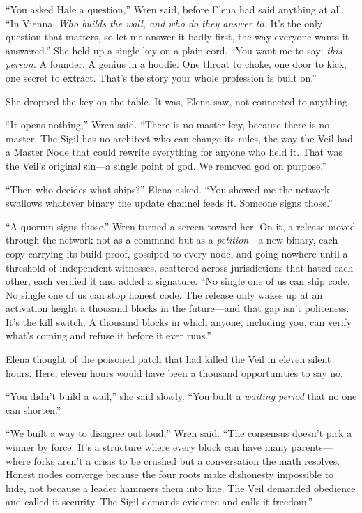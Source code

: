 ``You asked Hale a question,'' Wren said, before Elena had said anything at
all. ``In Vienna. \emph{Who builds the wall, and who do they answer to.} It's
the only question that matters, so let me answer it badly first, the way
everyone wants it answered.'' She held up a single key on a plain cord. ``You
want me to say: \emph{this person.} A founder. A genius in a hoodie. One throat
to choke, one door to kick, one secret to extract. That's the story your whole
profession is built on.''

She dropped the key on the table. It was, Elena saw, not connected to anything.

``It opens nothing,'' Wren said. ``There is no master key, because there is no
master. The Sigil has no architect who can change its rules, the way the Veil
had a Master Node that could rewrite everything for anyone who held it. That
was the Veil's original sin---a single point of god. We removed god on
purpose.''

``Then who decides what ships?'' Elena asked. ``You showed me the network
swallows whatever binary the update channel feeds it. Someone signs those.''

``A quorum signs those.'' Wren turned a screen toward her. On it, a release
moved through the network not as a command but as a \emph{petition}---a new
binary, each copy carrying its build-proof, gossiped to every node, and going
nowhere until a threshold of independent witnesses, scattered across
jurisdictions that hated each other, each verified it and added a signature.
``No single one of us can ship code. No single one of us can stop honest code.
The release only wakes up at an activation height a thousand blocks in the
future---and that gap isn't politeness. It's the kill switch. A thousand blocks
in which anyone, including you, can verify what's coming and refuse it before
it ever runs.''

Elena thought of the poisoned patch that had killed the Veil in eleven silent
hours. Here, eleven hours would have been a thousand opportunities to say no.

``You didn't build a wall,'' she said slowly. ``You built a \emph{waiting
period} that no one can shorten.''

``We built a way to disagree out loud,'' Wren said. ``The consensus doesn't
pick a winner by force. It's a structure where every block can have many
parents---where forks aren't a crisis to be crushed but a conversation the math
resolves. Honest nodes converge because the four roots make dishonesty
impossible to hide, not because a leader hammers them into line. The Veil
demanded obedience and called it security. The Sigil demands evidence and calls
it freedom.''


